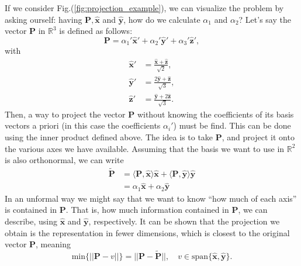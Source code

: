 If we consider Fig.(\ref{fig:projection_example}), we can visualize the problem by asking ourself: having $\mathbf{P}, \hat{\mathbf{x}}$ and $\hat{\mathbf{y}}$, how do we calculate $\alpha_1$ and $\alpha_2$?\newline
Let's say the vector $\mathbf{P}$ in $\mathbb{R}^3$ is defined as follows:
\begin{equation*}
\mathbf{P} = \alpha_1' \hat{\mathbf{x}}' + \alpha_2' \hat{\mathbf{y}}' + \alpha_3' \hat{\mathbf{z}}',
\end{equation*}
with 
\begin{align*}
    \hat{\mathbf{x}}' &= \frac{\hat{\mathbf{x}}+\hat{\mathbf{z}}}{\sqrt{2}},\\
    \hat{\mathbf{y}}' &= \frac{2\hat{\mathbf{y}}+\hat{\mathbf{z}}}{\sqrt{3}},\\
    \hat{\mathbf{z}}' &= \frac{\hat{\mathbf{y}}+2\hat{\mathbf{z}}}{\sqrt{3}}.
\end{align*}
Then, a way to project the vector $\mathbf{P}$ without knowing the coefficients of its basis vectors a priori (in this case the coefficients $\alpha_i'$) must be find.\newline
This can be done using the inner product defined above.\newline
The idea is to take $\mathbf{P}$, and project it onto the various axes we have available. Assuming that the basis we want to use in $\mathbb{R}^2$ is also orthonormal, we can write 
\begin{align*}
\tilde{\mathbf{P}} &= \langle \mathbf{P}, \hat{\mathbf{x}} \rangle  \hat{\mathbf{x}} + \langle \mathbf{P}, \hat{\mathbf{y}} \rangle  \hat{\mathbf{y}}\\
&= \alpha_1 \hat{\mathbf{x}} + \alpha_2 \hat{\mathbf{y}}
\end{align*}
In an unformal way we might say that we want to know ``how much of each axis'' is contained in $\mathbf{P}$. That is, how much information contained in $\mathbf{P}$, we can describe, using $\hat{\mathbf{x}}$ and $\hat{\mathbf{y}}$, respectively.\newline
It can be shown that the projection we obtain is the representation in fewer dimensions, which is closest to the original vector $\mathbf{P}$, meaning
\begin{equation*}
\text{min} \big\{ ||\mathbf{P}-v|| \big\} = ||\mathbf{P}-\tilde{\mathbf{P}}||,\quad v \in \text{span}\{ \hat{\mathbf{x}},\hat{\mathbf{y}} \}.
\end{equation*}

